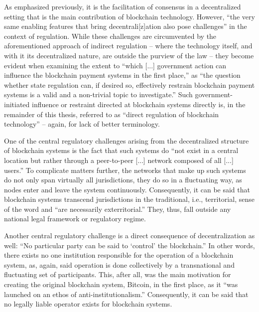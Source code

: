 As emphasized previously, it is the facilitation of consensus in a decentralized setting that is the main contribution of blockchain technology.
However, ``the very same enabling features that bring decentrali[z]ation also pose challenges'' in the context of regulation. \autocite[209]{ellul2020}
While these challenges are circumvented by the aforementioned approach of indirect regulation -- where the technology itself, and with it its decentralized nature, are outside the purview of the law -- they become evident when examining the extent to ``which [...] government action can influence the blockchain payment systems in the first place,'' as ``the question whether state regulation can, if desired so, effectively restrain blockchain payment systems is a valid and a non-trivial topic to investigate.'' \autocite[2]{shanaev2019}
Such government-initiated influence or restraint directed at blockchain systems directly is, in the remainder of this thesis, referred to as ``direct regulation of blockchain technology'' --  again, for lack of better terminology.

One of the central regulatory challenges arising from the decentralized structure of blockchain systems is the fact that such systems do ``not exist in a central location but rather through a peer-to-peer [...] network composed of all [...] users.'' \autocite[1128]{tsukerman2015}
To complicate matters further, the networks that make up such systems do not only span virtually all jurisdictions, they do so in a fluctuating way, as nodes enter and leave the system continuously.
Consequently, it can be said that blockchain systems transcend jurisdictions in the traditional, i.e., territorial, sense of the word and ``are necessarily exterritorial.'' \autocite[2]{shanaev2019}
They, thus, fall outside any national legal framework or regulatory regime.

Another central regulatory challenge is a direct consequence of decentralization as well:
``No particular party can be said to `control' the blockchain.'' \autocite[1129]{tsukerman2015}
In other words, there exists no one institution responsible for the operation of a blockchain system, as, again, said operation is done collectively by a transnational and fluctuating set of participants.
This, after all, was the main motivation for creating the original blockchain system, Bitcoin, in the first place, as it ``was launched on an ethos of anti-institutionalism.'' \autocite[6]{yeoh2017}
Consequently, it can be said that no legally liable operator exists for blockchain systems.

